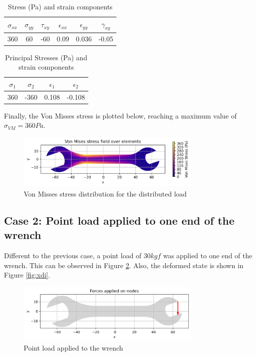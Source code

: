 \begin{table}[H]
    \centering
    \caption{Stress (Pa) and strain components}
    \begin{tabular}{|c|c|c|c|c|c|}
    \hline
    $\sigma_{xx}$ & $\sigma_{yy}$ & $\tau_{xy}$ & $\epsilon_{xx}$ & $\epsilon_{yy}$ & $\gamma_{xy}$ \\
    \hline
    360 & 60 & -60 & 0.09 & 0.036 & -0.05 \\
    \hline
    \end{tabular}
    \label{tab:tabla1}
\end{table}
    
\begin{table}[H]
    \centering
    \caption{Principal Stresses (Pa) and strain components}
    \begin{tabular}{|c|c|c|c|}
    \hline
    $\sigma_{1}$ & $\sigma_{2}$ & $\epsilon_{1}$ & $\epsilon_{2}$ \\
    \hline
    360 & -360 & 0.108 & -0.108 \\
    \hline
    \end{tabular}
    \label{tab:tabla2}
\end{table}

Finally, the Von Misses stress is plotted below, reaching a maximum value of $\sigma_{VM} = 360 Pa$.

\begin{figure}[H]
    \centering
    \includegraphics[width=0.8\textwidth]{GRAFICOS/Case b_von_mises.png}
    \caption{Von Misses stress distribution for the distributed load}
    \label{fig:principal}
\end{figure}

\subsection{Case 2: Point load applied to one end of the wrench}

Different to the previous case, a point load of $30 kgf$ was applied to one end of the wrench. This can be observed in Figure \ref{fig:xdd}. Also, the deformed state is shown in Figure \ref{fig:xdi}.

\begin{figure}[H]
    \centering
    \includegraphics[width=0.8\textwidth]{GRAFICOS/Case a_fuerzas.png}
    \caption{Point load applied to the wrench}
    \label{fig:xdd}
\end{figure}

